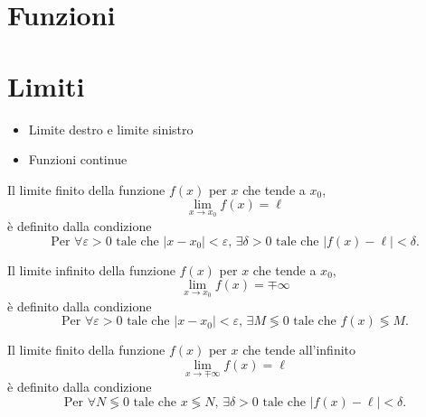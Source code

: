 \begin{definition}[]
\end{definition}

\section{Funzioni}
\begin{definition}
\end{definition}

\section{Limiti}
{\color{red}
\begin{itemize}
    \item Limite destro e limite sinistro
    \item Funzioni continue
\end{itemize}
}
\begin{definition} Il limite finito della funzione $f(x)$  per $x$ che tende a $x_0$,
    \begin{equation}
      \lim_{x \rightarrow x_0} f(x) = \ell
    \end{equation}
    è definito dalla condizione
    \begin{equation}
        \text{Per $\forall \varepsilon > 0$ tale che $|x-x_0| < \varepsilon$, $\exists \delta > 0$ tale che $|f(x) - \ell|< \delta$.}
    \end{equation}
\end{definition}
\begin{definition} Il limite infinito della funzione $f(x)$  per $x$ che tende a $x_0$,
    \begin{equation}
      \lim_{x \rightarrow x_0} f(x) = \mp \infty
    \end{equation}
    è definito dalla condizione
    \begin{equation}
        \text{Per $\forall \varepsilon > 0$ tale che $|x-x_0| < \varepsilon$, $\exists M \lessgtr 0$ tale che $f(x) \lessgtr M$.}
    \end{equation}
\end{definition}
\begin{definition} Il limite finito della funzione $f(x)$ per $x$ che tende all'infinito
    \begin{equation}
      \lim_{x \rightarrow \mp \infty} f(x) = \ell
    \end{equation}
    è definito dalla condizione
    \begin{equation}
        \text{Per $\forall N \lessgtr 0$ tale che $x \lessgtr  N$, $\exists \delta > 0$ tale che $|f(x) - \ell| < \delta$.}
    \end{equation}
\end{definition}
